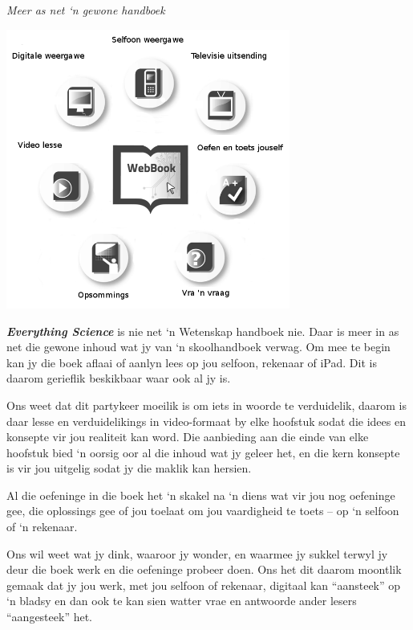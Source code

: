 
\newpage
\thispagestyle{empty}

{\normalfont\sffamily\fontsize{22}\normalfont\itshape Meer as net ‘n gewone handboek} \par

\begin{center}
\includegraphics[width=0.70\textwidth]{title_images/morethantextbookAfrikaans.png}
\end{center}

\par
{\normalsize
\textbf{\textit{Everything Science}} is nie net ‘n Wetenskap handboek nie. Daar is meer in as net die gewone inhoud wat jy van ‘n skoolhandboek verwag. Om mee te begin kan jy die boek aflaai of aanlyn lees op jou selfoon, rekenaar of iPad. Dit is daarom gerieflik beskikbaar waar ook al jy is.\par


Ons weet dat dit partykeer moeilik is om iets in woorde te verduidelik, daarom is daar lesse en verduidelikings in video-formaat by elke hoofstuk sodat die idees en konsepte vir jou realiteit kan word. Die aanbieding aan die einde van elke hoofstuk bied ‘n oorsig oor al die inhoud wat jy geleer het, en die kern konsepte is vir jou uitgelig sodat jy die maklik kan hersien.\par


Al die oefeninge in die boek het ‘n skakel na ‘n diens wat vir jou nog oefeninge gee, die oplossings gee of jou toelaat om jou vaardigheid te toets – op ‘n selfoon of ‘n rekenaar.\par


Ons wil weet wat jy dink, waaroor jy wonder, en waarmee jy sukkel terwyl jy deur die boek werk en die oefeninge probeer doen. Ons het dit daarom moontlik gemaak dat jy jou werk, met jou selfoon of rekenaar, digitaal kan “aansteek” op ‘n bladsy en dan ook te kan sien watter vrae en antwoorde ander lesers “aangesteek” het.\par


}





